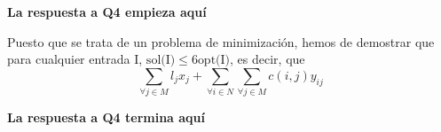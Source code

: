 

\textbf{La respuesta a Q4 empieza aquí}

Puesto que se trata de un problema de minimización, hemos de demostrar que
para cualquier entrada I, $\textrm{sol(I)} \leq 6\textrm{opt(I)}$, es decir, que
\begin{equation}
 \sum_{\forall j \in M} l_jx_j + \sum_{\forall i \in N} \sum_{\forall j \in M} c(i,j)y_{ij}
\end{equation}

\textbf{La respuesta a Q4 termina aquí}
